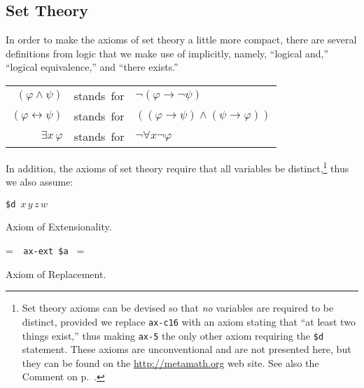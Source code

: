 \subsection{Set Theory}\label{mmsettheoryaxioms}

In order to make the axioms of set theory a little
more compact, there are several definitions from logic that we make use of
implicitly, namely, ``logical {\sc and},''
 ``logical equivalence,'' and
``there exists.''

\begin{center}\begin{tabular}{rcl}
  $( \varphi \wedge \psi )$ &\mbox{stands for}& $\neg ( \varphi
     \rightarrow \neg \psi )$\\
  $( \varphi \leftrightarrow \psi )$& \mbox{stands
     for}& $( ( \varphi \rightarrow \psi ) \wedge
     ( \psi \rightarrow \varphi ) )$\\
  $\exists x \,\varphi$ &\mbox{stands for}& $\neg \forall x \neg \varphi$
\end{tabular}\end{center}

In addition, the axioms of set theory require that all variables be
dis\-tinct,\footnote{Set theory axioms can be
devised so that {\em no} variables are required to be distinct,
provided we replace \texttt{ax-c16} with an axiom stating that ``at
least two things exist,'' thus
making \texttt{ax-5} the only other axiom requiring the
\texttt{\$d} statement.  These axioms are unconventional and are not
presented here, but they can be found on the \url{http://metamath.org}
web site.  See also the Comment on
p.~\pageref{nodd}.} thus we also assume:
\begin{center}
  \texttt{\$d }$x\,y\,z\,w$
\end{center}

\noindent Axiom of Extensionality.

\setbox\startprefix=\hbox{\tt \ \ ax-ext\ \$a\ }
\setbox\contprefix=\hbox{\tt \ \ \ \ \ \ \ \ \ \ \ \ }
\startm
\m{\vdash}\m{(}\m{\forall}\m{(}\m{\in}\m{\leftrightarrow}
\m{\in}\m{)}\m{\rightarrow}\m{=}\m{)}
\endm

\noindent Axiom of Replacement.

